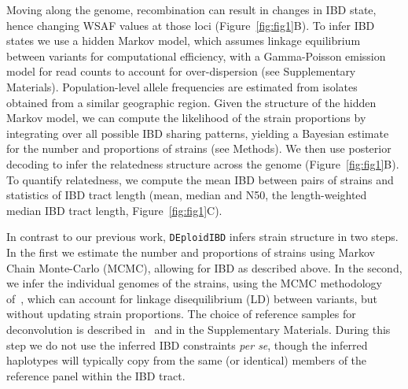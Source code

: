\documentclass[9pt,lineno]{elife}
\begin{document}
Moving along the genome, recombination can result in changes in IBD state, hence changing WSAF values at those loci (Figure~\ref{fig:fig1}B).  To infer IBD states we use a hidden Markov model, which assumes linkage equilibrium between variants for computational efficiency, with a Gamma-Poisson emission model for read counts to account for over-dispersion (see Supplementary Materials).  Population-level allele frequencies are estimated from isolates obtained from a similar geographic region.  Given the structure of the hidden Markov model, we can compute the likelihood of the strain proportions by integrating over all possible IBD sharing patterns, yielding a Bayesian estimate for the number and proportions of strains (see Methods).  We then use posterior decoding to infer the relatedness structure across the genome (Figure~\ref{fig:fig1}B). To quantify relatedness, we compute the mean IBD between pairs of strains and statistics of IBD tract length (mean, median and N50, the length-weighted median IBD tract length, Figure~\ref{fig:fig1}C).

In contrast to our previous work, \texttt{DEploidIBD} infers strain structure in two steps.  In the first we estimate the number and proportions of strains using Markov Chain Monte-Carlo (MCMC), allowing for IBD as described above.  In the second, we infer the individual genomes of the strains, using the MCMC methodology of~\citet{Zhu2017}, which can account for linkage disequilibrium (LD) between variants, but without updating strain proportions.  The choice of reference samples for deconvolution is described in~\citet{Zhu2017} and in the Supplementary Materials.  During this step we do not use the inferred IBD constraints {\em per se}, though the inferred haplotypes will typically copy from the same (or identical) members of the reference panel within the IBD tract.
\end{document}
